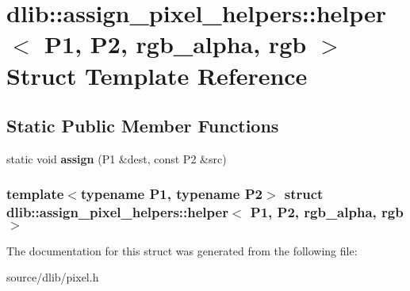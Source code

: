 \hypertarget{structdlib_1_1assign__pixel__helpers_1_1helper_3_01P1_00_01P2_00_01rgb__alpha_00_01rgb_01_4}{
\section{dlib::assign\_\-pixel\_\-helpers::helper$<$ P1, P2, rgb\_\-alpha, rgb $>$ Struct Template Reference}
\label{structdlib_1_1assign__pixel__helpers_1_1helper_3_01P1_00_01P2_00_01rgb__alpha_00_01rgb_01_4}
}
\subsection*{Static Public Member Functions}
\begin{DoxyCompactItemize}
\item 
\hypertarget{structdlib_1_1assign__pixel__helpers_1_1helper_3_01P1_00_01P2_00_01rgb__alpha_00_01rgb_01_4_afc4b1d4643809daf63e5090d25bb121c}{
static void {\bfseries assign} (P1 \&dest, const P2 \&src)}
\label{structdlib_1_1assign__pixel__helpers_1_1helper_3_01P1_00_01P2_00_01rgb__alpha_00_01rgb_01_4_afc4b1d4643809daf63e5090d25bb121c}

\end{DoxyCompactItemize}
\subsubsection*{template$<$typename P1, typename P2$>$ struct dlib::assign\_\-pixel\_\-helpers::helper$<$ P1, P2, rgb\_\-alpha, rgb $>$}



The documentation for this struct was generated from the following file:\begin{DoxyCompactItemize}
\item 
source/dlib/pixel.h\end{DoxyCompactItemize}
